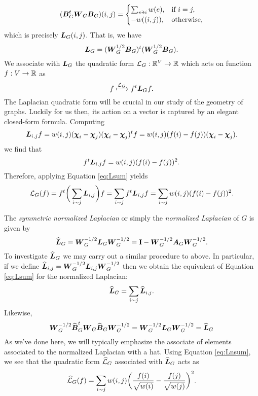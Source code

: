 \begin{align*}
(\vb*{B}_G^t\vb*{W}_G\vb*{B}_G)(i,j) = 
\begin{cases}
\sum_{e\ni i} w(e),&\text{if } i=j,\\
-w((i,j)),&\text{otherwise}, 
\end{cases}
\end{align*}
which is precisely $\vb*{L}_G(i,j)$. That is, we have 
 \begin{equation}
 \label{eq:L=BTB}
 \vb*{L}_G=(\vb*{W}_G^{1/2}\vb*{B}_G)^t(\vb*{W}_G^{1/2}\vb*{B}_G).
 \end{equation}
 We associate with $\vb*{L}_G$ the quadratic form $\mathcal{L}_G:\mathbb{R}^V\to \mathbb{R}$ which acts on function $f:V\to \mathbb{R}$ as 
\begin{equation*}
 f\xmapsto{\mathcal{L}_G} f^t \vb*{L}_G f.
\end{equation*}
The Laplacian quadratic form will be crucial in our study of the geometry of graphs. Luckily for us then, its action on a vector is captured by an elegant closed-form formula. 
Computing 
\begin{equation*}
    \vb*{L}_{i,j}f = w(i,j)(\boldsymbol{\chi}_i -\boldsymbol{\chi}_j)(\boldsymbol{\chi}_i-\boldsymbol{\chi}_j)^t f = w(i,j)(f(i)-f(j))(\boldsymbol{\chi}_i-\boldsymbol{\chi}_j).
\end{equation*}
we find that 
\[f^t \vb*{L}_{i,j} f = w(i,j)(f(i)-f(j))^2.\]
Therefore, applying Equation \ref{eq:Lsum} yields 
\begin{equation}
\label{eq:Lop}
    \mathcal{L}_G(f) = f^t \bigg(\sum_{i\sim j} \vb*{L}_{i,j}\bigg) f = \sum_{i\sim j}f^t \vb*{L}_{i,j} f= \sum_{i\sim j} w(i,j)(f(i)-f(j))^2.
\end{equation}

The \emph{symmetric normalized Laplacian} or simply the \emph{normalized Laplacian} of $G$ is given by \begin{equation*}
    \widehat{\vb*{L}}_G = \vb*{W}_G^{-1/2} \vb*{L}_G\vb*{W}_G^{-1/2} = \vb{I} - \vb*{W}_G^{-1/2} \vb*{A}_G\vb*{W}_{G}^{-1/2}.
\end{equation*} 
To investigate $\widehat{\vb*{L}}_G$ we may carry out a similar procedure to above. In particular, if we define $\widehat{\vb*{L}}_{i,j}=\vb*{W}_G^{-1/2} \vb*{L}_{i,j}\vb*{W}_G^{-1/2}$ then we obtain the equivalent of Equation \ref{eq:Lsum} for the normalized Laplacian:
\begin{equation}
\label{eq:Lnsum}
    \widehat{\vb*{L}}_G = \sum_{i\sim j}\widehat{\vb*{L}}_{i,j}.
\end{equation}
Likewise, 
\begin{equation*}
   \vb*{W}_G^{-1/2}\widehat{\vb*{B}}_G^t \vb*{W}_G\widehat{\vb*{B}}_G\vb*{W}_G^{-1/2} =  \vb*{W}_G^{-1/2}\vb*{L}_G\vb*{W}_G^{-1/2}=\widehat{\vb*{L}}_G
\end{equation*}
As we've done here, we will typically emphasize the associate of elements associated to the normalized Laplacian with a hat.
Using Equation \eqref{eq:Lnsum}, we see that 
the quadratic form $\widehat{\mathcal{L}}_G$ associated with $\widehat{\vb*{L}}_G$ acts as 
\begin{equation*}
    \widehat{\mathcal{L}}_G(f) = \sum_{i\sim j} w(i,j)\bigg(\frac{f(i)}{\sqrt{w(i)}}-\frac{f(j)}{\sqrt{w(j)}}\bigg)^2.
\end{equation*}

